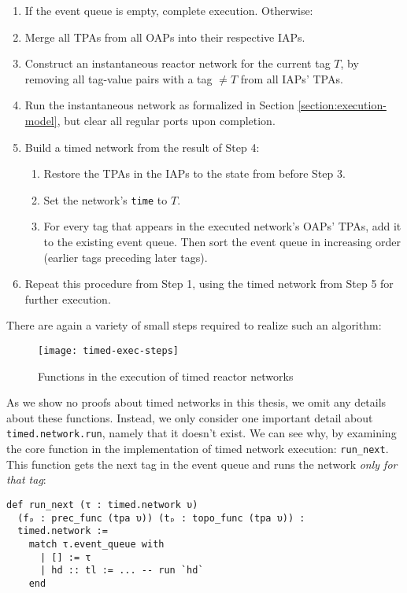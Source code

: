 \begin{enumerate}
  \item If the event queue is empty, complete execution. Otherwise:
  \item Merge all TPAs from all OAPs into their respective IAPs.
  \item Construct an instantaneous reactor network for the current tag $T$, by removing all tag-value pairs with a tag $\ne T$ from all IAPs' TPAs.
  \item Run the instantaneous network as formalized in Section \ref{section:execution-model}, but clear all regular ports upon completion.
  \item Build a timed network from the result of Step 4:
  \begin{enumerate}
    \item Restore the TPAs in the IAPs to the state from before Step 3.
    \item Set the network's \lstinline{time} to $T$.
    \item For every tag that appears in the executed network's OAPs' TPAs, add it to the existing event queue.
    Then sort the event queue in increasing order (earlier tags preceding later tags).
  \end{enumerate}
  \item Repeat this procedure from Step 1, using the timed network from Step 5 for further execution.
\end{enumerate}

\noindent There are again a variety of small steps required to realize such an algorithm:

\begin{figure}[h]
\centering
\texttt{[image: timed-exec-steps]}
\caption{Functions in the execution of timed reactor networks}
\label{fig:timed-exec-steps}
\end{figure}

\noindent As we show no proofs about timed networks in this thesis, we omit any details about these functions.
Instead, we only consider one important detail about \lstinline{timed.network.run}, namely that it doesn't exist.
We can see why, by examining the core function in the implementation of timed network execution: \lstinline{run_next}.
This function gets the next tag in the event queue and runs the network \emph{only for that tag}:

\begin{lstlisting}
def run_next (τ : timed.network υ)
  (fₚ : prec_func (tpa υ)) (tₚ : topo_func (tpa υ)) : 
  timed.network :=
    match τ.event_queue with 
      | [] := τ
      | hd :: tl := ... -- run `hd`
    end
\end{lstlisting}

